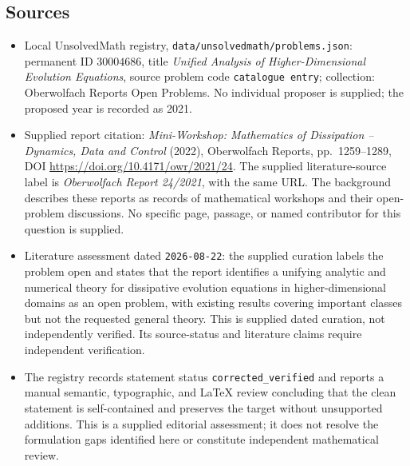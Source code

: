 \documentclass[11pt]{article}
\begin{document}
\subsection{Sources}
\begin{itemize}
\item Local UnsolvedMath registry, \texttt{data/unsolvedmath/problems.json}: permanent ID \(30004686\), title \emph{Unified Analysis of Higher-Dimensional Evolution Equations}, source problem code \texttt{catalogue entry}; collection: Oberwolfach Reports Open Problems. No individual proposer is supplied; the proposed year is recorded as 2021.
\item Supplied report citation: \emph{Mini-Workshop: Mathematics of Dissipation -- Dynamics, Data and Control} (2022), Oberwolfach Reports, pp.\ 1259--1289, DOI \url{https://doi.org/10.4171/owr/2021/24}. The supplied literature-source label is \emph{Oberwolfach Report 24/2021}, with the same URL. The background describes these reports as records of mathematical workshops and their open-problem discussions. No specific page, passage, or named contributor for this question is supplied.
\item Literature assessment dated \texttt{2026-08-22}: the supplied curation labels the problem open and states that the report identifies a unifying analytic and numerical theory for dissipative evolution equations in higher-dimensional domains as an open problem, with existing results covering important classes but not the requested general theory. This is supplied dated curation, not independently verified. Its source-status and literature claims require independent verification.
\item The registry records statement status \texttt{corrected\_verified} and reports a manual semantic, typographic, and LaTeX review concluding that the clean statement is self-contained and preserves the target without unsupported additions. This is a supplied editorial assessment; it does not resolve the formulation gaps identified here or constitute independent mathematical review.
\end{itemize}
\end{document}
